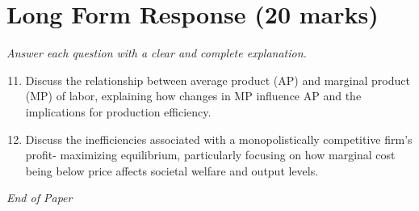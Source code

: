 \documentclass[12pt]{article}
\begin{document}
\section*{Long Form Response (20 marks)}
\textit{Answer each question with a clear and complete explanation.}
\begin{enumerate}[label=\arabic*.]
\setcounter{enumi}{10}
\item Discuss the relationship between average product (AP) and marginal product (MP) of labor, explaining how changes in MP influence AP and the implications for production efficiency.
\item Discuss the inefficiencies associated with a monopolistically competitive firm's profit- maximizing equilibrium, particularly focusing on how marginal cost being below price affects societal welfare and output levels.
\end{enumerate}

\vfill
\noindent\textit{End of Paper}
\end{document}
